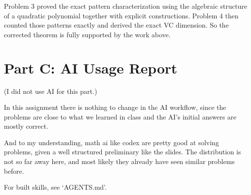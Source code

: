 \documentclass{article}
\begin{document}
Problem 3 proved the exact pattern characterization using the algebraic structure of a quadratic polynomial together with explicit constructions. Problem 4 then counted those patterns exactly and derived the exact VC dimension. So the corrected theorem is fully supported by the work above.

\newpage
\section{Part C: AI Usage Report}

(I did not use AI for this part.)

In this assignment there is nothing to change in the AI workflow, since the problems are close to what we learned in class and the AI's initial answers are mostly correct.

And to my understanding, math ai like codex are pretty good at solving problems, given a well structured preliminary like the slides. The distribution is not so far away here, and most likely they already have seen similar problems before.

For built skills, see `AGENTS.md'.
\end{document}
